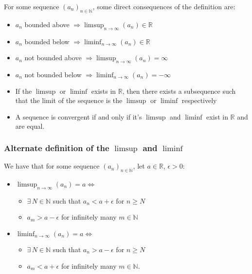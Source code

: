 \documentclass[a4paper, 12pt, twoside]{article}
\begin{document}
For some sequence $(a_n)_{n \in \mathbb{N}}$, some direct consequences
of the definition are:

\begin{itemize}
      \item $a_n$ bounded above $\Rightarrow \limsup_{n\to\infty}(a_n)
                  \in \mathbb{R}$
      \item $a_n$ bounded below $\Rightarrow \liminf_{n\to\infty}(a_n)
                  \in \mathbb{R}$
      \item $a_n$ not bounded above $\Rightarrow \limsup_{n\to\infty}(a_n)
                  = \infty$
      \item $a_n$ not bounded below $\Rightarrow \liminf_{n\to\infty}(a_n)
                  = -\infty$
      \item If the $\limsup$ or $\liminf$ exists in $\mathbb{R}$, then there
            exists a subsequence such that the limit of the sequence is
            the $\limsup$ or $\liminf$ respectively
      \item A sequence is convergent if and only if it's $\limsup$ and $\liminf$
            exist in $\mathbb{R}$ and are equal.
\end{itemize}

\newpage

\subsubsection{Alternate definition of the $\limsup$ and $\liminf$}

We have that for some sequence $(a_n)_{n \in \mathbb{N}}$, let
$a \in \mathbb{R}$, $\epsilon > 0$:

\begin{itemize}
      \item $\limsup_{n\to\infty}(a_n) = a \Leftrightarrow$ \begin{itemize}
                  \item $\exists \, N \in \mathbb{N}$ such that
                        $a_n < a + \epsilon$ for $n \geq N$
                  \item $a_m > a - \epsilon$ for infinitely many $m \in \mathbb{N}$
            \end{itemize}
      \item $\liminf_{n\to\infty}(a_n) = a \Leftrightarrow$ \begin{itemize}
                  \item $\exists \, N \in \mathbb{N}$ such that
                        $a_n > a - \epsilon$ for $n \geq N$
                  \item $a_m < a + \epsilon$ for infinitely many $m \in \mathbb{N}$.
            \end{itemize}
\end{itemize}
\end{document}
